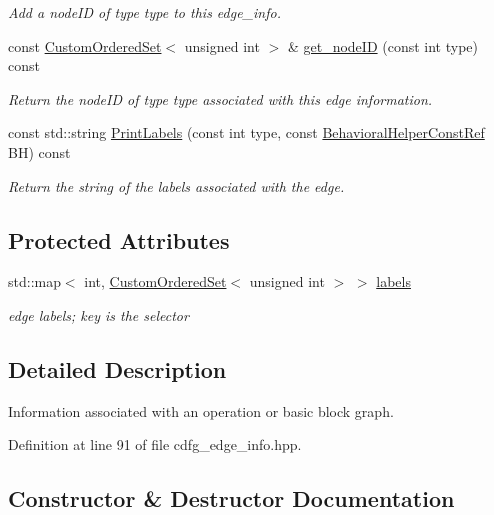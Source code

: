 \begin{DoxyCompactItemize}
\begin{DoxyCompactList}\small\item\em Add a node\+ID of type type to this edge\+\_\+info. \end{DoxyCompactList}\item 
const \hyperlink{classCustomOrderedSet}{Custom\+Ordered\+Set}$<$ unsigned int $>$ \& \hyperlink{structCdfgEdgeInfo_ae5c707c6af7c0553144247c0f255d26b}{get\+\_\+node\+ID} (const int type) const
\begin{DoxyCompactList}\small\item\em Return the node\+ID of type type associated with this edge information. \end{DoxyCompactList}\item 
const std\+::string \hyperlink{structCdfgEdgeInfo_a505a8d89775aa583b86bf84e5ddb91f9}{Print\+Labels} (const int type, const \hyperlink{behavioral__helper_8hpp_aae973b54cac87eef3b27442aa3e1e425}{Behavioral\+Helper\+Const\+Ref} BH) const
\begin{DoxyCompactList}\small\item\em Return the string of the labels associated with the edge. \end{DoxyCompactList}\end{DoxyCompactItemize}
\subsection*{Protected Attributes}
\begin{DoxyCompactItemize}
\item 
std\+::map$<$ int, \hyperlink{classCustomOrderedSet}{Custom\+Ordered\+Set}$<$ unsigned int $>$ $>$ \hyperlink{structCdfgEdgeInfo_a9ef9bbae9b574d8bdc11007b7f240aa6}{labels}
\begin{DoxyCompactList}\small\item\em edge labels; key is the selector \end{DoxyCompactList}\end{DoxyCompactItemize}


\subsection{Detailed Description}
Information associated with an operation or basic block graph. 

Definition at line 91 of file cdfg\+\_\+edge\+\_\+info.\+hpp.



\subsection{Constructor \& Destructor Documentation}
\mbox{\label{structCdfgEdgeInfo_aa91cf4a7716a99292f9388c9b25fb693}} 
